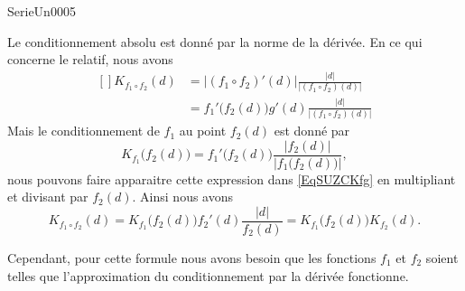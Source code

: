 
\begin{corrige}{SerieUn0005}

	Le conditionnement absolu est donné par la norme de la dérivée. En ce qui concerne le  relatif, nous avons 
	\begin{equation}		\label{EqSUZCKfg}
		\begin{aligned}[]
			K_{f_1\circ f_2}(d)&=| (f_1\circ f_2)'(d) |\frac{ | d | }{ | (f_1\circ f_2)(d) | }\\
			&=f_1'\big( f_2(d) \big)g'(d)\frac{ | d | }{ | (f_1\circ f_2)(d) | }
		\end{aligned}
	\end{equation}
	Mais le conditionnement de $f_1$ au point $f_2(d)$ est donné par
	\begin{equation}
		K_{f_1}\big( f_2(d) \big)=f_1'\big( f_2(d) \big)\frac{ | f_2(d) | }{ | f_1\big( f_2(d) \big) | },
	\end{equation}
	nous pouvons faire apparaitre cette expression dans \eqref{EqSUZCKfg} en multipliant et divisant par $f_2(d)$. Ainsi nous avons
	\begin{equation}
		K_{f_1\circ f_2}(d)=K_{f_1}\big( f_2(d) \big)f_2'(d)\frac{ | d | }{ f_2(d) }=K_{f_1}\big( f_2(d) \big)K_{f_2}(d).
	\end{equation}
	
	Cependant, pour cette formule nous avons besoin que les fonctions $f_1$ et $f_2$ soient telles que l'approximation du conditionnement par la dérivée fonctionne.

\end{corrige}

